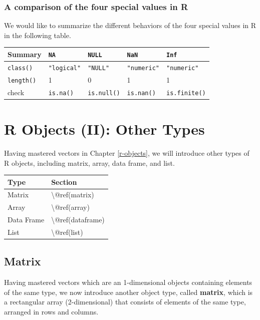 \documentclass[
]{book}
\begin{document}
\hypertarget{a-comparison-of-the-four-special-values-in-r}{%
\subsection{A comparison of the four special values in R}\label{a-comparison-of-the-four-special-values-in-r}}

We would like to summarize the different behaviors of the four special values in R in the following table.

\begin{longtable}[]{@{}lllll@{}}
\toprule
Summary & \texttt{NA} & \texttt{NULL} & \texttt{NaN} & \texttt{Inf} \\
\midrule
\endhead
\texttt{class()} & \texttt{"logical"} & \texttt{"NULL"} & \texttt{"numeric"} & \texttt{"numeric"} \\
\texttt{length()} & 1 & 0 & 1 & 1 \\
check & \texttt{is.na()} & \texttt{is.null()} & \texttt{is.nan()} & \texttt{is.finite()} \\
\bottomrule
\end{longtable}

\hypertarget{r-objects-other-types}{%
\chapter{R Objects (II): Other Types}\label{r-objects-other-types}}

Having mastered vectors in Chapter \ref{r-objects}, we will introduce other types of R objects, including matrix, array, data frame, and list.

\begin{tabular}{l|l}
\hline
Type & Section\\
\hline
Matrix & \textbackslash{}@ref(matrix)\\
\hline
Array & \textbackslash{}@ref(array)\\
\hline
Data Frame & \textbackslash{}@ref(dataframe)\\
\hline
List & \textbackslash{}@ref(list)\\
\hline
\end{tabular}

\hypertarget{matrix}{%
\section{Matrix}\label{matrix}}

Having mastered vectors which are an 1-dimensional objects containing elements of the same type, we now introduce another object type, called \textbf{matrix}, which is a rectangular array (2-dimensional) that consists of elements of the same type, arranged in rows and columns.
\end{document}
